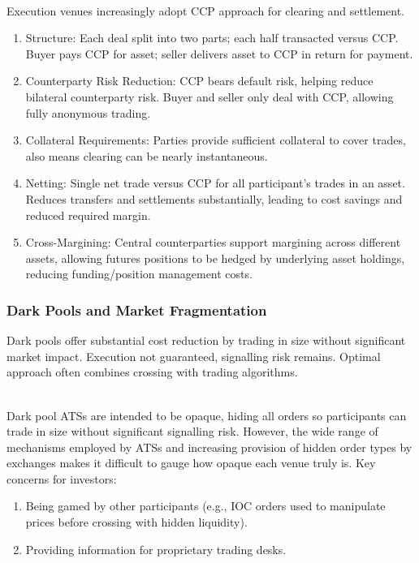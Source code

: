 \begin{definition} \\
Execution venues increasingly adopt CCP approach for clearing and settlement.
\begin{enumerate}[label=\roman*.]
\setlength{\itemsep}{0pt}
\item Structure: Each deal split into two parts; each half transacted versus CCP. Buyer pays CCP for asset; seller delivers asset to CCP in return for payment.
\item Counterparty Risk Reduction: CCP bears default risk, helping reduce bilateral counterparty risk. Buyer and seller only deal with CCP, allowing fully anonymous trading.
\item Collateral Requirements: Parties provide sufficient collateral to cover trades, also means clearing can be nearly instantaneous.
\item Netting: Single net trade versus CCP for all participant's trades in an asset. Reduces transfers and settlements substantially, leading to cost savings and reduced required margin.
\item Cross-Margining: Central counterparties support margining across different assets, allowing futures positions to be hedged by underlying asset holdings, reducing funding/position management costs.
\end{enumerate}
\end{definition}

\subsubsection{Dark Pools and Market Fragmentation}

Dark pools offer substantial cost reduction by trading in size without significant market impact. Execution not guaranteed, signalling risk remains. Optimal approach often combines crossing with trading algorithms.

\begin{remark} \\
Dark pool ATSs are intended to be opaque, hiding all orders so participants can trade in size without significant signalling risk. However, the wide range of mechanisms employed by ATSs and increasing provision of hidden order types by exchanges makes it difficult to gauge how opaque each venue truly is. Key concerns for investors:
\begin{enumerate}[label=\roman*.]
\setlength{\itemsep}{0pt}
\item Being gamed by other participants (e.g., IOC orders used to manipulate prices before crossing with hidden liquidity).
\item Providing information for proprietary trading desks.
\end{enumerate}
\end{remark}


